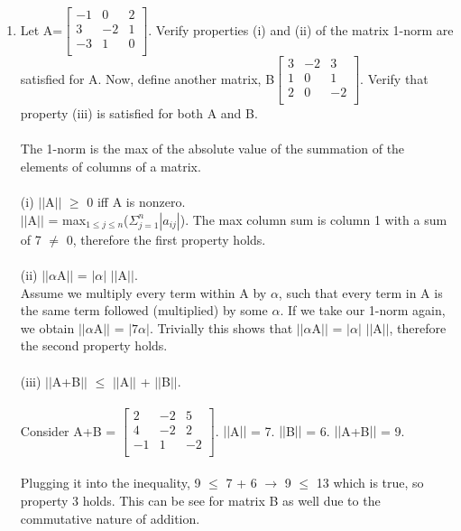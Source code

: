 \documentclass[12pt]{article}
\begin{document}
\begin{enumerate}
\item Let A=$\begin{bmatrix}
    -1 & 0 & 2\\
   3 & -2 & 1 \\
   -3 & 1 & 0 \\
\end{bmatrix}$. Verify properties (i) and (ii) of the matrix 1-norm are satisfied for A. Now, define another matrix, B$\begin{bmatrix}
    3 & -2 & 3\\
   1 & 0 & 1 \\
   2 & 0 & -2 \\
\end{bmatrix}$. Verify that property (iii) is satisfied for both A and B. \\ \\
The 1-norm is the max of the absolute value of the summation of the elements of columns of a matrix. \\ \\
(i) $||$A$||$ $\geq$ 0 iff A is nonzero. \\
$||$A$||$ = max$_{1\leq j\leq n}$($\Sigma_{j=1}^n |a_{ij}|$). The max column sum is column 1 with a sum of 7 $\neq$ 0, therefore the first property holds. \\ \\
(ii) $||\alpha$A$||$ = $|\alpha|$ $||$A$||$. \\
Assume we multiply every term within A by $\alpha$, such that every term in A is the same term followed (multiplied) by some $\alpha$. If we take our 1-norm again, we obtain $||\alpha$A$||$ = $|7\alpha|$. Trivially this shows that $||\alpha$A$||$ = $|\alpha|$ $||$A$||$, therefore the second property holds. \\ \\
(iii) $||$A+B$||$ $\leq$ $||$A$||$ + $||$B$||$. \\ \\
Consider A+B = $\begin{bmatrix}
    2 & -2 & 5\\
   4 & -2 & 2 \\
   -1 & 1 & -2 \\
\end{bmatrix}$. $||$A$||$ = 7. $||$B$||$ = 6. $||$A+B$||$ = 9.\\ \\ Plugging it into the inequality, 9 $\leq$ 7 + 6 $\rightarrow$ 9 $\leq$ 13 which is true, so property 3 holds. This can be see for matrix B as well due to the commutative nature of addition.\\

\end{enumerate}
\end{document}
